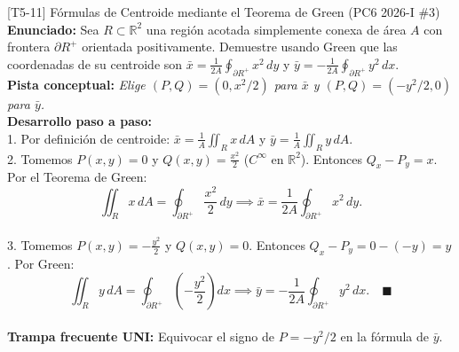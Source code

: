 \documentclass[11pt,a4paper]{article}
\begin{document}
\begin{ejerciciobox}{[T5-11] Fórmulas de Centroide mediante el Teorema de Green (PC6 2026-I \#3)}
\textbf{Enunciado:} Sea $R \subset \mathbb{R}^2$ una región acotada simplemente conexa de área $A$ con frontera $\partial R^+$ orientada positivamente. Demuestre usando Green que las coordenadas de su centroide son $\bar{x} = \frac{1}{2A}\oint_{\partial R^+} x^2\,dy$ y $\bar{y} = -\frac{1}{2A}\oint_{\partial R^+} y^2\,dx$.\\[0.2cm]
\textbf{Pista conceptual:} \emph{Elige $(P,Q) = (0, x^2/2)$ para $\bar{x}$ y $(P,Q) = (-y^2/2, 0)$ para $\bar{y}$.}\\[0.2cm]
\textbf{Desarrollo paso a paso:}\\
1. Por definición de centroide: $\bar{x} = \frac{1}{A}\iint_R x\,dA$ y $\bar{y} = \frac{1}{A}\iint_R y\,dA$.\\
2. Tomemos $P(x,y) = 0$ y $Q(x,y) = \frac{x^2}{2}$ ($C^\infty$ en $\mathbb{R}^2$). Entonces $Q_x - P_y = x$. Por el Teorema de Green:\\
$$\iint_R x\,dA = \oint_{\partial R^+} \frac{x^2}{2}\,dy \implies \bar{x} = \frac{1}{2A}\oint_{\partial R^+} x^2\,dy.$$\\
3. Tomemos $P(x,y) = -\frac{y^2}{2}$ y $Q(x,y) = 0$. Entonces $Q_x - P_y = 0 - (-y) = y$. Por Green:\\
$$\iint_R y\,dA = \oint_{\partial R^+} \left(-\frac{y^2}{2}\right)dx \implies \bar{y} = -\frac{1}{2A}\oint_{\partial R^+} y^2\,dx. \quad \blacksquare$$\\[0.2cm]
\textbf{Trampa frecuente UNI:} Equivocar el signo de $P = -y^2/2$ en la fórmula de $\bar{y}$.
\end{ejerciciobox}
\end{document}
